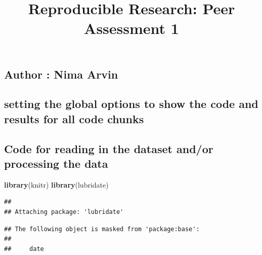 \documentclass[]{article}
\title{Reproducible Research: Peer Assessment 1}
\author{}
\date{}
\newenvironment{Shaded}{\begin{snugshade}}{\end{snugshade}}
\newcommand{\KeywordTok}[1]{\textcolor[rgb]{0.13,0.29,0.53}{\textbf{#1}}}
\newcommand{\DataTypeTok}[1]{\textcolor[rgb]{0.13,0.29,0.53}{#1}}
\newcommand{\OtherTok}[1]{\textcolor[rgb]{0.56,0.35,0.01}{#1}}
\newcommand{\OperatorTok}[1]{\textcolor[rgb]{0.81,0.36,0.00}{\textbf{#1}}}
\newcommand{\NormalTok}[1]{#1}
\begin{document}
\maketitle

\subsection{Author : Nima Arvin}\label{author-nima-arvin}

\subsection{setting the global options to show the code and results for
all code
chunks}\label{setting-the-global-options-to-show-the-code-and-results-for-all-code-chunks}

\begin{Shaded}
\end{Shaded}

\subsection{Code for reading in the dataset and/or processing the
data}\label{code-for-reading-in-the-dataset-andor-processing-the-data}

\begin{Shaded}
\begin{Highlighting}[]
\KeywordTok{library}\NormalTok{(knitr)}
\KeywordTok{library}\NormalTok{(lubridate)}
\end{Highlighting}
\end{Shaded}

\begin{verbatim}
## 
## Attaching package: 'lubridate'
\end{verbatim}

\begin{verbatim}
## The following object is masked from 'package:base':
## 
##     date
\end{verbatim}
\end{document}
